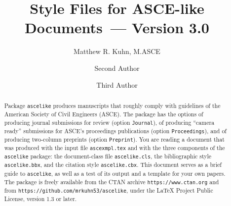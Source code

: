 \documentclass[Proceedings]{ascelike}
\begin{document}
%
\title{Style Files for ASCE-like Documents~--- Version 3.0}
%
\author[1]{Matthew R. Kuhn, M.ASCE}
\author[2]{Second Author}
\author[2]{Third Author}
%
\maketitle
%
\begin{abstract}
Package \texttt{ascelike} produces manuscripts
that roughly comply with
guidelines of the American Society of Civil Engineers (ASCE).
The package has the options of producing journal submissions
for review (option \texttt{Journal}),
of producing ``camera ready'' submissions for ASCE's proceedings
publications (option \texttt{Proceedings}),
and of producing two-column preprints (option \texttt{Preprint}).
You are reading a document that was produced with the input
file \texttt{ascexmpl.tex}
and with the three components of
the \texttt{ascelike} package:
the document-class file \texttt{ascelike.cls}, 
the bibliographic style \texttt{ascelike.bbx}, and
the citation style \texttt{ascelike.cbx}.
This document serves as a brief guide to \texttt{ascelike},
as well as a test of its output and a template for your own papers.
The package is freely available from the CTAN archive
\verb+https://www.ctan.org+
and from \verb+https://github.com/mrkuhn53/ascelike+,
under the LaTeX 
Project Public License, version 1.3 or later.
%
%
\end{abstract}
%
%
\end{document}
